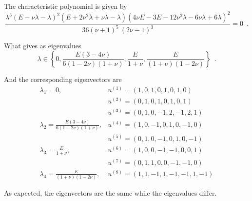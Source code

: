 \documentclass[12pt,letterpaper]{article}
\begin{document}
The characteristic polynomial is given by
\begin{equation}
  \frac{\lambda^3 (E - \nu\lambda - \lambda)^2(E + 2\nu^2\lambda + \nu\lambda - \lambda)(4\nu E - 3E - 12\nu^2\lambda - 6\nu\lambda + 6\lambda)^2}{36(\nu + 1)^5\ (2\nu - 1)^3}=0 \enspace .
\end{equation}

What gives as eigenvalues
\[\lambda \in \left\{0,
	\frac{E(3 - 4\nu)}{6(1 - 2\nu)(1 + \nu)},
	\frac{E}{1 + \nu},
	\frac{E}{(1 + \nu)(1 - 2\nu)} \right\} \enspace .
\]

And the corresponding eigenvectors are
\begin{equation}
\begin{array}{ll}
\lambda_1 = 0, 
	&u^{(1)} = (1, 0, 1, 0, 1, 0, 1, 0)\\
	&u^{(2)} = (0, 1, 0, 1, 0, 1, 0, 1)\\
	&u^{(3)} = (0, 1, 0, -1, 2, -1, 2, 1)\\
\lambda_2 = \frac{E(3 - 4\nu)}{6(1 - 2\nu)(1 + \nu)}, 
	&u^{(4)} = (1, 0, -1, 0, 1, 0, -1, 0)\\
	&u^{(5)} = (0, 1, 0, -1, 0, 1, 0, -1)\\
\lambda_3 = \frac{E}{1 + \nu}, 
	&u^{(6)} = (1, 0, 0, -1, -1, 0, 0, 1)\\
	&u^{(7)} = (0, 1, 1, 0, 0, -1, -1, 0)\\
\lambda_4 = \frac{E}{(1 + \nu)(1 - 2\nu)}, 
	&u^{(8)} = (1, 1, -1, 1, -1, -1, 1, -1)
\end{array}
\end{equation}

As expected, the eigenvectors are the same while the eigenvalues differ.
\end{document}
